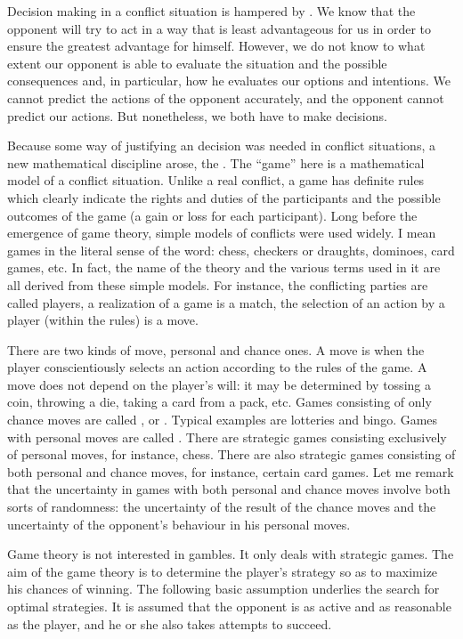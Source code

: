 Decision making in a conflict situation is hampered by . We know that the opponent will try
to act in a way that is least advantageous for us in order to ensure the
greatest advantage for himself. However, we do not know to what extent
our opponent is able to evaluate the situation and the possible
consequences and, in particular, how he evaluates our options and
intentions. We cannot predict the actions of the opponent accurately,
and the opponent cannot predict our actions. But nonetheless, we both
have to make decisions.

Because some way of justifying an  decision was needed in
conflict situations, a new mathematical discipline arose, the . The ``game'' here is a mathematical model of a conflict situation.
Unlike a real conflict, a game has definite rules which clearly indicate
the rights and duties of the participants and the possible outcomes of
the game (a gain or loss for each participant). Long before the
emergence of game theory, simple models of conflicts were used widely.
I mean games in the literal sense of the word: chess, checkers or
draughts, dominoes, card games, etc. In fact, the name of the theory and
the various terms used in it are all derived from these simple models.
For instance, the conflicting parties are called players, a realization of
a game is a match, the selection of an action by a player (within the
rules) is a move.

There are two kinds of move, personal and chance ones. A 
move is when the player conscientiously selects an action according to
the rules of the game. A  move does not depend on the player's
will: it may be determined by tossing a coin, throwing a die, taking
a card from a pack, etc. Games consisting of only chance moves are
called , or . Typical examples are lotteries and bingo. Games with personal moves are called .
There are strategic games consisting exclusively of personal moves, for
instance, chess. There are also strategic games consisting of both
personal and chance moves, for instance, certain card games. Let me
remark that the uncertainty in games with both personal and chance
moves involve both sorts of randomness: the uncertainty of the result of
the chance moves and the uncertainty of the opponent's behaviour in his
personal moves.

Game theory is not interested in gambles. It only deals with strategic
games. The aim of the game theory is to determine the player's strategy
so as to maximize his chances of winning. The following basic
assumption underlies the search for optimal strategies. It is assumed that
the opponent is as active and as reasonable as the player, and he or she
also takes attempts to succeed.


